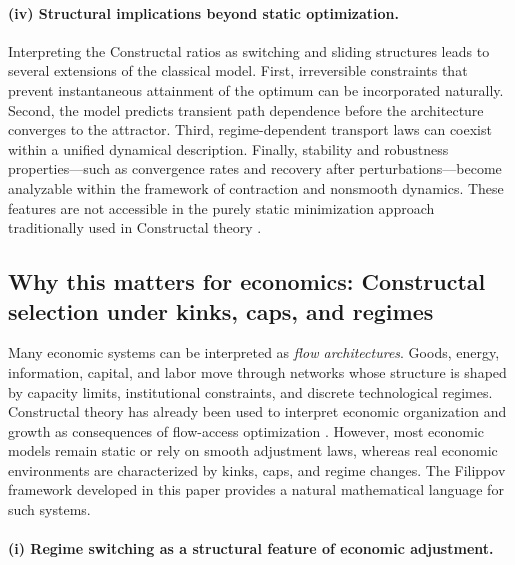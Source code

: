 \documentclass[12pt]{article}
\theoremstyle{plain}
\theoremstyle{definition}
\theoremstyle{remark}
\begin{document}
\paragraph{(iv) Structural implications beyond static optimization.}

Interpreting the Constructal ratios as switching and sliding
structures leads to several extensions of the classical model.
First, irreversible constraints that prevent instantaneous
attainment of the optimum can be incorporated naturally.
Second, the model predicts transient path dependence before the
architecture converges to the attractor.
Third, regime-dependent transport laws can coexist within a unified
dynamical description.
Finally, stability and robustness properties—such as convergence
rates and recovery after perturbations—become analyzable within the
framework of contraction and nonsmooth dynamics.
These features are not accessible in the purely static
minimization approach traditionally used in Constructal theory
\cite{BejanLorente2011,BejanLorente2013JAP}.



\subsection{Why this matters for economics: Constructal selection under kinks, caps, and regimes}
\label{subsec:discussion_econ_value}

Many economic systems can be interpreted as \emph{flow architectures}.
Goods, energy, information, capital, and labor move through networks
whose structure is shaped by capacity limits, institutional constraints,
and discrete technological regimes.
Constructal theory has already been used to interpret economic
organization and growth as consequences of flow-access optimization
\cite{BejanBadescuDeVos2000AE,BejanErreraGunes2020}.
However, most economic models remain static or rely on smooth adjustment
laws, whereas real economic environments are characterized by
kinks, caps, and regime changes.
The Filippov framework developed in this paper provides a natural
mathematical language for such systems.

\paragraph{(i) Regime switching as a structural feature of economic adjustment.}
\end{document}
